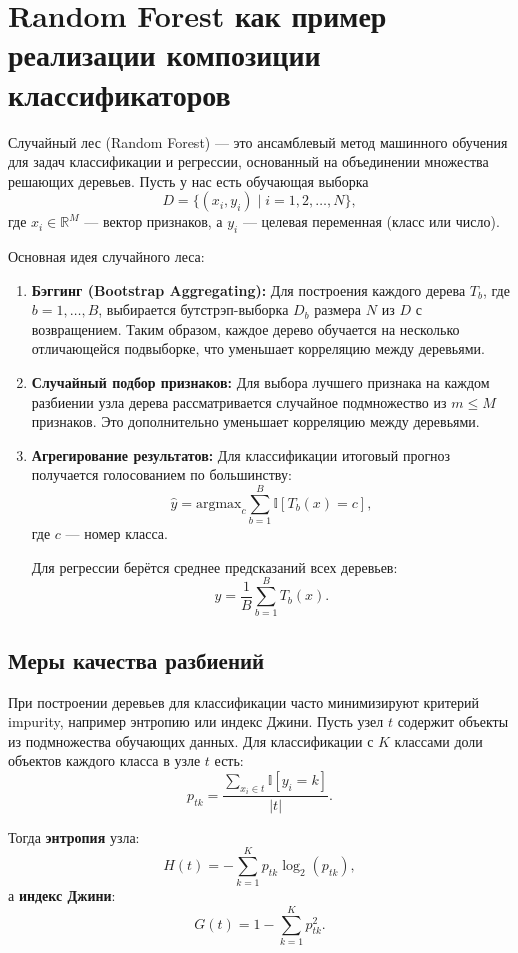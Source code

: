 \section*{Random Forest как пример реализации композиции классификаторов}

Случайный лес (Random Forest) — это ансамблевый метод машинного обучения для задач классификации и регрессии, основанный на объединении множества решающих деревьев. Пусть у нас есть обучающая выборка 
\[
D = \{ (x_i, y_i) \mid i = 1, 2, \ldots, N \},
\]
где \(x_i \in \mathbb{R}^M\) — вектор признаков, а \(y_i\) — целевая переменная (класс или число).

Основная идея случайного леса:
\begin{enumerate}
    \item \textbf{Бэггинг (Bootstrap Aggregating):} Для построения каждого дерева \(T_b\), где \(b = 1, \ldots, B\), выбирается бутстрэп-выборка \(D_b\) размера \(N\) из \(D\) с возвращением. Таким образом, каждое дерево обучается на несколько отличающейся подвыборке, что уменьшает корреляцию между деревьями.
    \item \textbf{Случайный подбор признаков:} Для выбора лучшего признака на каждом разбиении узла дерева рассматривается случайное подмножество из \(m \leq M\) признаков. Это дополнительно уменьшает корреляцию между деревьями.
    \item \textbf{Агрегирование результатов:} Для классификации итоговый прогноз получается голосованием по большинству:
    \[
    \hat{y} = \text{argmax}_c \sum_{b=1}^B \mathbb{I}[T_b(x) = c],
    \]
    где \(c\) — номер класса.
    
    Для регрессии берётся среднее предсказаний всех деревьев:
    \[
    \hat{y} = \frac{1}{B} \sum_{b=1}^{B} T_b(x).
    \]
\end{enumerate}

\subsection*{Меры качества разбиений}

При построении деревьев для классификации часто минимизируют критерий impurity, например энтропию или индекс Джини. Пусть узел \(t\) содержит объекты из подмножества обучающих данных. Для классификации с \(K\) классами доли объектов каждого класса в узле \(t\) есть:
\[
p_{tk} = \frac{\sum_{x_i \in t} \mathbb{I}[y_i = k]}{|t|}.
\]

\noindent Тогда \textbf{энтропия} узла:
\[
H(t) = -\sum_{k=1}^K p_{tk} \log_2 (p_{tk}),
\]
а \textbf{индекс Джини}:
\[
G(t) = 1 - \sum_{k=1}^K p_{tk}^2.
\]

